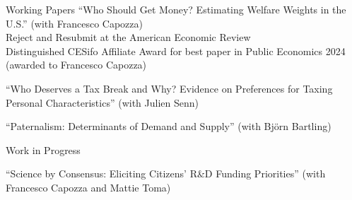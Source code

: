 \documentclass{resume} %
\begin{document}
\begin{rSection}{Working Papers}
  ``Who Should Get Money? Estimating Welfare Weights in the U.S.'' (with Francesco Capozza) \\ \vspace{0.1em}
  { \normalsize  \hspace*{0.9em} Reject and Resubmit at the American Economic Review }\\\vspace{0.1em}
  { \normalsize  \hspace*{0.8em} Distinguished CESifo Affiliate Award for best paper in Public Economics 2024 (awarded \hspace*{1.3em} to Francesco Capozza)} 

  ``Who Deserves a Tax Break and Why? Evidence on
  Preferences for Taxing Personal Characteristics'' (with Julien Senn)

  ``Paternalism: Determinants of Demand and Supply'' (with Bj\"{o}rn Bartling)

  \end{rSection}

\begin{rSection}{Work in Progress}

  ``Science by Consensus: Eliciting Citizens' R\&D Funding Priorities'' (with Francesco Capozza and Mattie Toma) 


\end{rSection}
\end{document}
